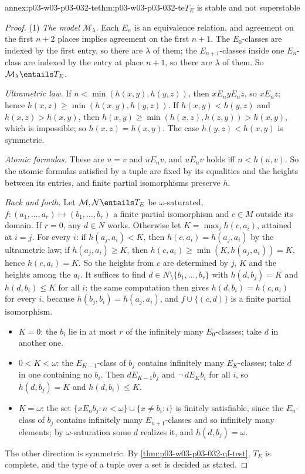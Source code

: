 \begin{annexitem}{annex:p03-w03-p03-032-te}{thm:p03-w03-p03-032-te}{\(T_E\) is stable and not superstable}
\begin{proof}
(1) \emph{The model \(\mathcal M_\lambda\).}  Each \(E_n\) is an equivalence
relation, and agreement on the first \(n+2\) places implies agreement on
the first \(n+1\).  The \(E_0\)-classes are indexed by the first entry, so
there are \(\lambda\) of them; the \(E_{n+1}\)-classes inside one
\(E_n\)-class are indexed by the entry at place \(n+1\), so there are
\(\lambda\) of them.  So \(\mathcal M_\lambda\entails T_E\).

\emph{Ultrametric law.}  If \(n<\min(h(x,y),h(y,z))\), then
\(x\mathrel{E_n}y\mathrel{E_n}z\), so \(x\mathrel{E_n}z\); hence
\(h(x,z)\geq\min(h(x,y),h(y,z))\).  If \(h(x,y)<h(y,z)\) and
\(h(x,z)>h(x,y)\), then \(h(x,y)\geq\min(h(x,z),h(z,y))>h(x,y)\), which is
impossible; so \(h(x,z)=h(x,y)\).  The case \(h(y,z)<h(x,y)\) is symmetric.

\emph{Atomic formulas.}  These are \(u=v\) and \(u\mathrel{E_n}v\), and
\(u\mathrel{E_n}v\) holds iff \(n<h(u,v)\).  So the atomic formulas satisfied
by a tuple are fixed by its equalities and the heights between its entries,
and finite partial isomorphisms preserve \(h\).

\emph{Back and forth.}  Let \(\mathcal M,\mathcal N\entails T_E\) be
\(\omega\)-saturated, \(f:(a_1,\ldots,a_r)\mapsto(b_1,\ldots,b_r)\) a finite
partial isomorphism and \(c\in M\) outside its domain.  If \(r=0\), any
\(d\in N\) works.  Otherwise let \(K=\max_ih(c,a_i)\), attained at
\(i=j\).  For every \(i\): if \(h(a_j,a_i)<K\), then
\(h(c,a_i)=h(a_j,a_i)\) by the ultrametric law; if \(h(a_j,a_i)\geq K\), then
\(h(c,a_i)\geq\min(K,h(a_j,a_i))=K\), hence \(h(c,a_i)=K\).  So the heights
from \(c\) are determined by \(j\), \(K\) and the heights among the \(a_i\).
It suffices to find \(d\in N\setminus\{b_1,\ldots,b_r\}\) with
\(h(d,b_j)=K\) and \(h(d,b_i)\leq K\) for all \(i\): the same computation
then gives \(h(d,b_i)=h(c,a_i)\) for every \(i\), because
\(h(b_j,b_i)=h(a_j,a_i)\), and \(f\cup\{(c,d)\}\) is a finite partial
isomorphism.
\begin{itemize}
  \item \(K=0\): the \(b_i\) lie in at most \(r\) of the infinitely many
        \(E_0\)-classes; take \(d\) in another one.
  \item \(0<K<\omega\): the \(E_{K-1}\)-class of \(b_j\) contains infinitely
        many \(E_K\)-classes; take \(d\) in one containing no \(b_i\).  Then
        \(d\mathrel{E_{K-1}}b_j\) and \(\neg\,d\mathrel{E_K}b_i\) for all
        \(i\), so \(h(d,b_j)=K\) and \(h(d,b_i)\leq K\).
  \item \(K=\omega\): the set \(\{x\mathrel{E_n}b_j:n<\omega\}\cup
        \{x\neq b_i:i\}\) is finitely satisfiable, since the
        \(E_n\)-class of \(b_j\) contains infinitely many \(E_{n+1}\)-classes
        and so infinitely many elements; by \(\omega\)-saturation some \(d\)
        realizes it, and \(h(d,b_j)=\omega\).
\end{itemize}
The other direction is symmetric.  By \cref{thm:p03-w03-p03-032-qf-test},
\(T_E\) is complete, and the type of a tuple over a set is decided as stated.


\end{proof}
\end{annexitem}
